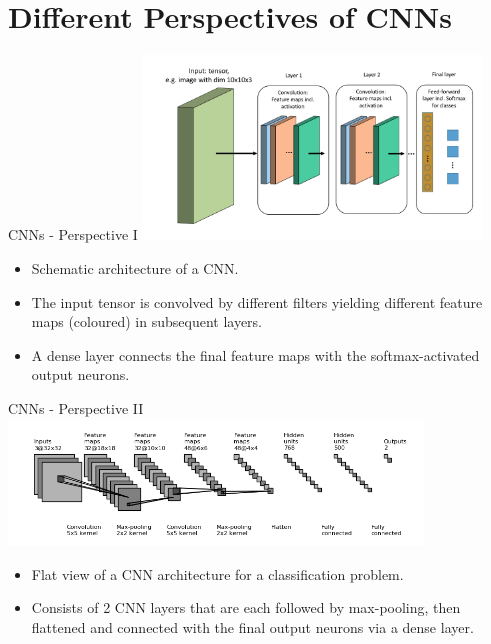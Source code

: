 







\section{Different Perspectives of CNNs}
\begin{vbframe}{CNNs - Perspective I}
\center
\includegraphics[width=9cm]{figure/cnn_scheme.png}
\begin{itemize}
\item Schematic architecture of a CNN.
\item The input tensor is convolved by different filters yielding different feature maps (coloured) in subsequent layers.
\item A dense layer connects the final feature maps with the softmax-activated output neurons.
\end{itemize}
\end{vbframe}

\begin{vbframe}{CNNs - Perspective II}
\center
\includegraphics[width=11cm]{figure/cnn_flat.png}
\begin{itemize}
\item Flat view of a CNN architecture for a classification problem.
\item Consists of 2 CNN layers that are each followed by max-pooling, then flattened and connected with the final output neurons via a dense layer.
\end{itemize}
\end{vbframe}

